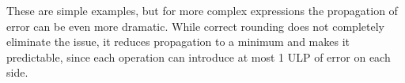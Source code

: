 
These are simple examples, but for more complex expressions the propagation of error can be even more dramatic. While correct rounding does not completely eliminate the issue, it reduces propagation to a minimum and makes it predictable, since each operation can introduce at most 1 ULP of error on each side.

%
